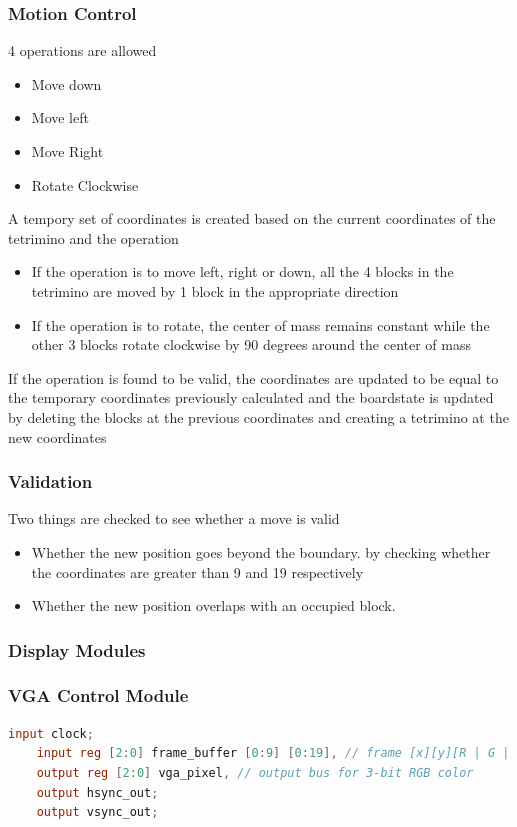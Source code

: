 \subsubsection{Motion Control }
\label{subsubsection:motioncontrol}
4 operations are allowed
\begin{itemize}
    \item Move down
    \item Move left
    \item Move Right
    \item Rotate Clockwise
\end{itemize}
 A tempory set of coordinates is created based on the current coordinates of the tetrimino and the operation 
 \begin{itemize}
     \item If the operation is to move left, right or down, all the 4 blocks in the tetrimino are moved by 1 block in the appropriate direction
     \item If the operation is to rotate, the center of mass remains constant while the other 3 blocks rotate clockwise by 90 degrees around the center of mass
 \end{itemize}
 If the operation is found to be valid, the coordinates are updated to
 be equal to the temporary coordinates previously calculated and the boardstate is updated by deleting the blocks at the previous coordinates
 and creating a tetrimino at the new coordinates

\subsubsection{Validation }
\label{subsubsection:validation}
Two things are checked to see whether a move is valid 
\begin{itemize}
    \item Whether the new position goes beyond the boundary. 
    by checking  whether the coordinates are greater than 9 and 19 respectively
    \item Whether the new position overlaps with an occupied block. 
   
\end{itemize}

\subsubsection{Display Modules}
\label{subsection:display}

\subsubsection{VGA Control Module}
\label{subsubsection:vgacontrol}
%
\begin{lstlisting}[language=Verilog]
    input clock;
    input reg [2:0] frame_buffer [0:9] [0:19], // frame [x][y][R | G | B]
    output reg [2:0] vga_pixel, // output bus for 3-bit RGB color
    output hsync_out;
    output vsync_out;
\end{lstlisting}

